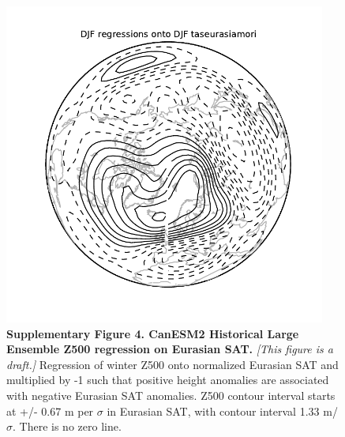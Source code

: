 \documentclass{nature}
\begin{document}
\begin{figure}%
\centering
\noindent\includegraphics[width=25pc]{SuppFigure4.pdf}
\caption{\textbf{Supplementary Figure 4. CanESM2 Historical Large Ensemble Z500 regression on Eurasian SAT.} \textit{[This figure is a draft.]} Regression of winter Z500 onto normalized Eurasian SAT and multiplied by -1 such that positive height anomalies are associated with negative Eurasian SAT anomalies. Z500 contour interval starts at +/- 0.67 m per $\sigma$ in Eurasian SAT, with contour interval 1.33 m/$\sigma$. There is no zero line.
}
\label{fig:supp4} 
\end{figure}


\newpage
\end{document}
